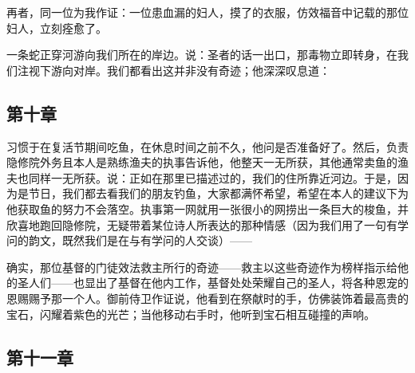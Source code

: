 再者，同一位为我作证：一位患血漏的妇人，摸了的衣服，仿效福音中记载的那位妇人，立刻痊愈了。\par

一条蛇正穿河游向我们所在的岸边。说：圣者的话一出口，那毒物立即转身，在我们注视下游向对岸。我们都看出这并非没有奇迹；他深深叹息道：\par


\subsection{第十章}

习惯于在复活节期间吃鱼，在休息时间之前不久，他问是否准备好了。然后，负责隐修院外务且本人是熟练渔夫的执事告诉他，他整天一无所获，其他通常卖鱼的渔夫也同样一无所获。说：正如在那里已描述过的，我们的住所靠近河边。于是，因为是节日，我们都去看我们的朋友钓鱼，大家都满怀希望，希望在本人的建议下为他获取鱼的努力不会落空。执事第一网就用一张很小的网捞出一条巨大的梭鱼，并欣喜地跑回隐修院，无疑带着某位诗人所表达的那种情感（因为我们用了一句有学问的韵文，既然我们是在与有学问的人交谈）——\par

确实，那位基督的门徒效法救主所行的奇迹——救主以这些奇迹作为榜样指示给他的圣人们——也显出了基督在他内工作，基督处处荣耀自己的圣人，将各种恩宠的恩赐赐予那一个人。御前侍卫作证说，他看到在祭献时的手，仿佛装饰着最高贵的宝石，闪耀着紫色的光芒；当他移动右手时，他听到宝石相互碰撞的声响。\par


\subsection{第十一章}


